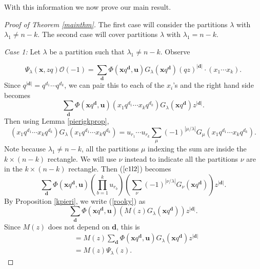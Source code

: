 \documentclass[12pt]{article}
\newcommand{\OC}{\mathcal{O}}
\theoremstyle{plain}
\theoremstyle{definition}
\newcommand{\xb}{\boldsymbol{x}}
\newcommand{\ub}{\boldsymbol{u}}
\begin{document}
With this information we now prove our main result.
\begin{proof}[Proof of Theorem \ref{mainthm}]
     The first case will consider the partitions $\lambda$ with $\lambda_1 \neq n-k$. The second case will cover partitions $\lambda$ with $\lambda_1 =n-k$. 
\vspace{0.5cm}

\noindent\emph{Case 1:}
Let $\lambda$ be a partition such that $\lambda_1 \neq n-k$. Observe

\begin{equation*}
    \Psi_\lambda(\xb, zq)  \OC(-1)=\sum  \limits_{\boldsymbol{d}} \Phi(\xb q^{\boldsymbol{d}},\ub) G_{\lambda} \left( \xb q^{\boldsymbol{d}}\right) (qz)^{|\boldsymbol{d}|} \cdot\left({x_1 \cdots  x_k}\right).
\end{equation*}
Since $q^{|\boldsymbol{d}|}=q^{d_1}\cdots q^{d_k}$, we can pair this to each of the $x_i$'s and the right hand side becomes
\begin{equation}\label{c1l2}
    \sum \limits_{\boldsymbol{d}} \Phi(\xb  q^{\boldsymbol{d}},\ub)\left({x_1q^{d_1}\cdots x_kq^{d_k}}\right)G_{\lambda} \left( \xb  q^{\boldsymbol{d}}\right)z^{|\boldsymbol{d}|}.
\end{equation}
Then using Lemma \ref{pierigkprop},  
$$
(x_1q^{d_1}\cdots x_k q^{d_k})G_\lambda (x_1q^{d_1}\cdots x_k q^{d_k}) = u_{r_1}\cdots u_{r_k} \sum_\mu  (-1)^{|\mu/\lambda|} G_\mu (x_1q^{d_1}\cdots x_k q^{d_k}).
$$
Note because $\lambda_1\neq n-k$, all the partitions $\mu$ indexing the sum are inside the $k\times (n-k)$ rectangle. We will use $\nu$ instead to indicate all the partitions $\nu$ are in the $k\times (n-k)$ rectangle. Then ($\ref{c1l2}$) becomes
\begin{equation} \label{rooky}
    \sum \limits_{\boldsymbol{d}} \Phi(\xb  q^{\boldsymbol{d}},\ub)\left(\prod_{b=1} ^k {u_{r _b}} \right) \left(\sum_{\nu} (-1)^{|\nu/\lambda|} G_{\nu}(\xb q^{\boldsymbol{d}})\right)z^{|\boldsymbol{d}|}.
\end{equation}
By Proposition \ref{kpieri}, we write (\ref{rooky}) as
\begin{equation*}
    \sum \limits_{\boldsymbol{d}} \Phi(\xb q^{\boldsymbol{d}},\ub)\left(M(z)G_\lambda\left(\xb q^{\boldsymbol{d}}\right)\right)z^{|\boldsymbol{d}|}.
\end{equation*}
Since $M(z)$ does not depend on $\boldsymbol{d}$, this is
\begin{align*}
    &=M(z)\sum \limits_{\boldsymbol{d}} \Phi(\xb q^{\boldsymbol{d}},\ub)G_\lambda\left(\xb q^{\boldsymbol{d}}\right)z^{|\boldsymbol{d}|}\\
    &=M(z)\Psi_\lambda (z).
\end{align*}
\vspace{0.2cm}


\end{proof}
\end{document}
